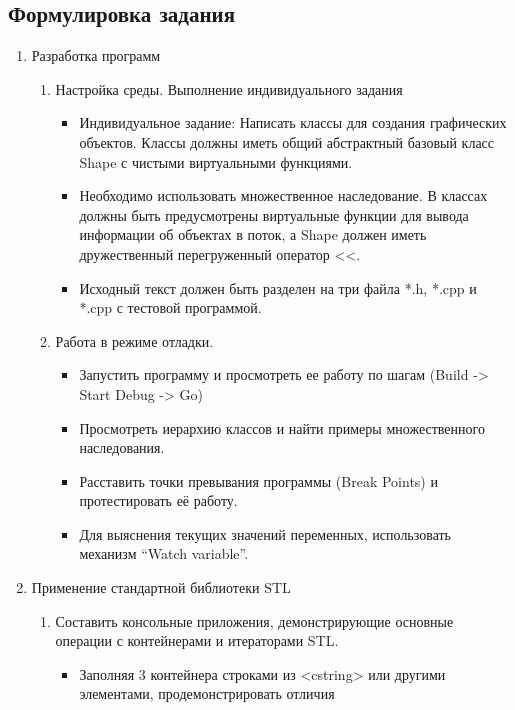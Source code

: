 \documentclass[a4paper, 14pt]{extarticle}
\begin{document}
\subsection{Формулировка задания}
\begin{enumerate}
    \item Разработка программ
    \begin{enumerate}
        \item Настройка среды. Выполнение индивидуального задания
        \begin{itemize}
            \item Индивидуальное задание: Написать классы для создания графических объектов. Классы должны иметь общий абстрактный базовый класс Shape с чистыми виртуальными функциями.
            \item Необходимо использовать множественное наследование. В классах должны быть предусмотрены виртуальные функции для вывода информации об объектах в поток, а Shape должен иметь дружественный перегруженный оператор <<.
            \item Исходный текст должен быть разделен на три файла *.h, *.cpp и *.cpp с тестовой программой.
        \end{itemize}
        \item Работа в режиме отладки.
        \begin{itemize}
            \item Запустить программу и просмотреть ее работу по шагам (Build -> Start Debug -> Go)
            \item Просмотреть иерархию классов и найти примеры множественного наследования.
            \item Расставить точки превывания программы (Break Points) и протестировать её работу.
            \item Для выяснения текущих значений переменных, использовать механизм ``Watch variable''.
        \end{itemize}
    \end{enumerate}
    \item Применение стандартной библиотеки STL
    \begin{enumerate}
        \item Составить консольные приложения, демонстрирующие основные операции с контейнерами и итераторами STL.\@
        \begin{itemize}
            \item Заполняя 3 контейнера строками из <cstring> или другими элементами, продемонстрировать отличия

\end{itemize}
\end{enumerate}
\end{enumerate}
\end{document}
